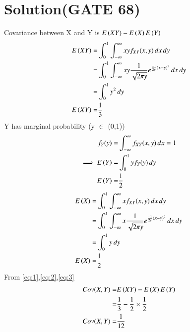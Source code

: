 \documentclass[journal,12pt,twocolumn]{IEEEtran}
\begin{document}
\section*{\textbf{Solution(GATE 68)}}
Covariance between X and Y is $E\left(XY\right)-E\left(X\right)E\left(Y\right)$\\
\begin{align}
    E\left(XY\right)=&\int_{0}^{1}\int_{-\infty}^{\infty}xy f_{XY}(x,y)\,dx\,dy\\
    =&\int_{0}^{1}\int_{-\infty}^{\infty}xy\frac{1}{\sqrt{2\pi y}}e^{\frac{-1}{2y}(x-y)^2}\,dx \,dy\\
    =&\int_{0}^{1}y^2 \,dy\\
     E\left(XY\right)=&\frac{1}{3} \label{eq:1}
    \end{align}
Y has marginal probability (y $\in$ (0,1))
\begin{align}
    f_Y(y)=&\int_{-\infty}^{\infty}f_{XY}(x,y)\,dx =1\\
    \implies E\left(Y\right)=&\int_{0}^{1} y f_{Y}(y)\,dy\\
    E\left(Y\right)=&\frac{1}{2} \label{eq:2}
\end{align}
\begin{align}
 E\left(X\right)=&\int_{0}^{1}\int_{-\infty}^{\infty}x f_{XY}(x,y)\,dx\,dy\\
    =&\int_{0}^{1}\int_{-\infty}^{\infty}x\frac{1}{\sqrt{2\pi y}}e^{\frac{-1}{2y}(x-y)^2}\,dx \,dy\\
    =&\int_{0}^{1}y\,dy\\
E\left(X\right)=&\frac{1}{2} \label{eq:3} \\
\end{align}
From \eqref{eq:1},\eqref{eq:2},\eqref{eq:3}
\begin{align}
Cov(X,Y)=&E\left(XY\right)-E\left(X\right)E\left(Y\right)\\
       =&\frac{1}{3}-\frac{1}{2}\times \frac{1}{2}\\
Cov(X,Y)=&\frac{1}{12}
\end{align}
\end{document}
